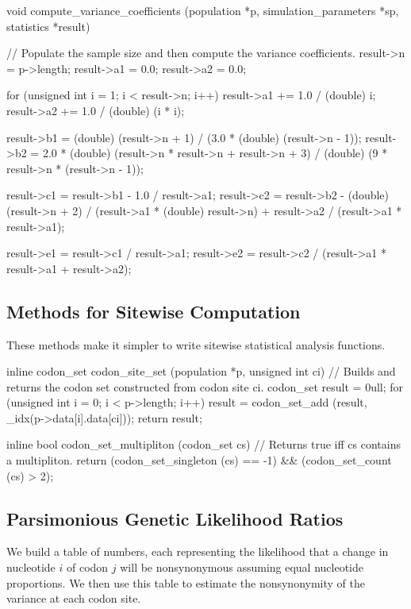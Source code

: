 \documentclass{article}
\begin{document}
\begin{ccode}
void compute_variance_coefficients (population *p, simulation_parameters *sp, statistics *result) {
  // Populate the sample size and then compute the variance coefficients.
  result->n 		= p->length;
  result->a1		= 0.0;
  result->a2		= 0.0;

  for (unsigned int i = 1; i < result->n; i++) {
    result->a1 += 1.0 / (double) i;
    result->a2 += 1.0 / (double) (i * i);
  }

  result->b1 = (double) (result->n + 1) / (3.0 * (double) (result->n - 1));
  result->b2 = 2.0 * (double) (result->n * result->n + result->n + 3) /
		     (double) (9 * result->n * (result->n - 1));

  result->c1 = result->b1 - 1.0 / result->a1;
  result->c2 = result->b2 -
	       (double) (result->n + 2) / (result->a1 * (double) result->n) +
	       result->a2 / (result->a1 * result->a1);

  result->e1 = result->c1 / result->a1;
  result->e2 = result->c2 / (result->a1 * result->a1 + result->a2);
}
\end{ccode}

    \subsection{Methods for Sitewise Computation}
      \label{sec:sitewise-computation}

      These methods make it simpler to write sitewise statistical analysis
      functions.

\begin{ccode}
inline codon_set codon_site_set (population *p, unsigned int ci) {
  // Builds and returns the codon set constructed from codon site ci.
  codon_set result = 0ull;
  for (unsigned int i = 0; i < p->length; i++)
    result = codon_set_add (result, _idx(p->data[i].data[ci]));
  return result;
}

inline bool codon_set_multipliton (codon_set cs) {
  // Returns true iff cs contains a multipliton.
  return (codon_set_singleton (cs) == -1) && (codon_set_count (cs) > 2);
}
\end{ccode}

    \subsection{Parsimonious Genetic Likelihood Ratios}
      \label{sec:genetic-likelihoods}

      We build a table of numbers, each representing the likelihood that a
      change in nucleotide $i$ of codon $j$ will be nonsynonymous assuming equal
      nucleotide proportions. We then use this table to estimate the
      nonsynonymity of the variance at each codon site.
\end{document}

